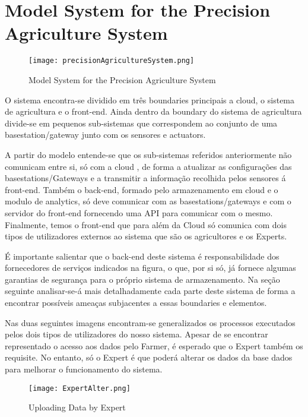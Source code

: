 \section{Model System for the Precision Agriculture System}

\begin{figure}[H]

	\centering

 	\texttt{[image: precisionAgricultureSystem.png]}

 	\caption {Model System for the Precision Agriculture System}

  	\label{fig01}
\end{figure}

	O sistema encontra-se dividido em três boundaries principais a cloud, o sistema de agricultura e o front-end. Ainda dentro da boundary do sistema de agricultura divide-se em pequenos sub-sistemas que correspondem ao conjunto de uma basestation/gateway junto com os sensores e actuators.

	A partir do modelo entende-se que os sub-sistemas referidos anteriormente não comunicam entre si, só com a cloud , de forma a atualizar as configurações das basestations/Gateways e a transmitir a informação recolhida pelos sensores á front-end. Também o back-end, formado pelo armazenamento em cloud e o modulo de analytics, só deve comunicar com as basestations/gateways e com o servidor do front-end fornecendo uma API para comunicar com o mesmo. Finalmente, temos o front-end que para além da Cloud só comunica com dois tipos de utilizadores externos ao sistema que são os agricultores e os Experts.

	É importante salientar que o back-end deste sistema é responsabilidade dos fornecedores de serviços indicados na figura, o que, por si só, já fornece algumas garantias de segurança para o próprio sistema de armazenamento. Na seção seguinte analisar-se-á mais detalhadamente cada parte deste sistema de forma a encontrar possíveis ameaças subjacentes a essas boundaries e elementos.

	Nas duas seguintes imagens encontram-se generalizados os processos executados pelos dois tipos de utilizadores do nosso sistema. Apesar de se encontrar representado o acesso aos dados pelo Farmer, é esperado que o Expert também os requisite. No entanto, só o Expert é que poderá alterar os dados da base dados para melhorar o funcionamento do sistema.

\begin{figure}[h!]

	\centering

 	\texttt{[image: ExpertAlter.png]}

 	\caption {Uploading Data by Expert}

  	\label{fig02}
\end{figure}



